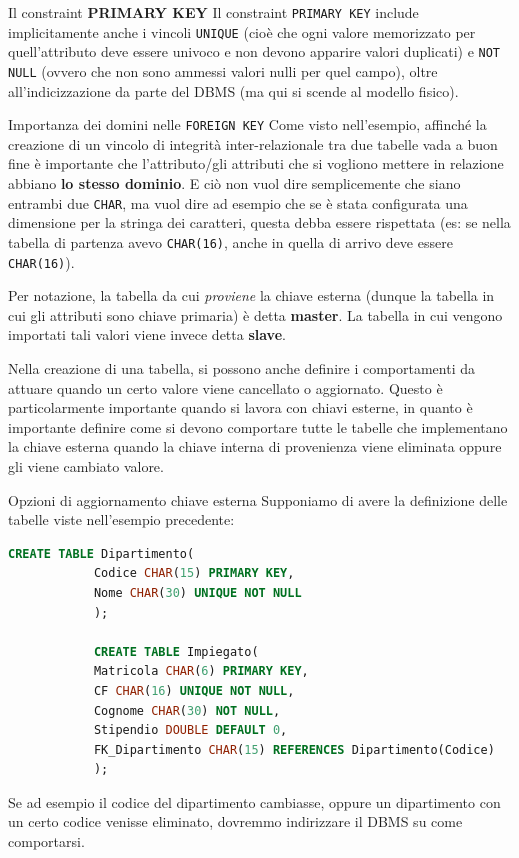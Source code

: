 \documentclass[12pt]{report}
\begin{document}
	\begin{osservazione}{Il constraint \textbf{PRIMARY KEY}}{}
		Il constraint \texttt{PRIMARY KEY} include implicitamente anche i vincoli \texttt{UNIQUE} (cioè che ogni valore memorizzato per quell'attributo deve essere univoco e non devono apparire valori duplicati) e \texttt{NOT NULL} (ovvero che non sono ammessi valori nulli per quel campo), oltre all'indicizzazione da parte del DBMS (ma qui si scende al modello fisico).
	\end{osservazione}
	
	\begin{osservazione}{Importanza dei domini nelle \texttt{FOREIGN KEY}}{}
		Come visto nell'esempio, affinché la creazione di un vincolo di integrità inter-relazionale tra due tabelle vada a buon fine è importante che l'attributo/gli attributi che si vogliono mettere in relazione abbiano \textbf{lo stesso dominio}. E ciò non vuol dire semplicemente che siano entrambi due \texttt{CHAR}, ma vuol dire ad esempio che se è stata configurata una dimensione per la stringa dei caratteri, questa debba essere rispettata (es: se nella tabella di partenza avevo \texttt{CHAR(16)}, anche in quella di arrivo deve essere \texttt{CHAR(16)}).
		\smallbreak
		
		Per notazione, la tabella da cui \textit{proviene} la chiave esterna (dunque la tabella in cui gli attributi sono chiave primaria) è detta \textbf{master}. La tabella in cui vengono importati tali valori viene invece detta \textbf{slave}.
	\end{osservazione}
	
	Nella creazione di una tabella, si possono anche definire i comportamenti da attuare quando un certo valore viene cancellato o aggiornato. Questo è particolarmente importante quando si lavora con chiavi esterne, in quanto è importante definire come si devono comportare tutte le tabelle che implementano la chiave esterna quando la chiave interna di provenienza viene eliminata oppure gli viene cambiato valore.\\
	\begin{esempio}{Opzioni di aggiornamento chiave esterna}{}
		Supponiamo di avere la definizione delle tabelle viste nell'esempio precedente:
		\begin{lstlisting}[language=SQL]
			CREATE TABLE Dipartimento(
			Codice CHAR(15) PRIMARY KEY,
			Nome CHAR(30) UNIQUE NOT NULL
			);
			
			CREATE TABLE Impiegato(
			Matricola CHAR(6) PRIMARY KEY,
			CF CHAR(16) UNIQUE NOT NULL,
			Cognome CHAR(30) NOT NULL,
			Stipendio DOUBLE DEFAULT 0,
			FK_Dipartimento CHAR(15) REFERENCES Dipartimento(Codice)
			);
		\end{lstlisting}
		Se ad esempio il codice del dipartimento cambiasse, oppure un dipartimento con un certo codice venisse eliminato, dovremmo indirizzare il DBMS su come comportarsi.
	\end{esempio}
	
\end{document}
